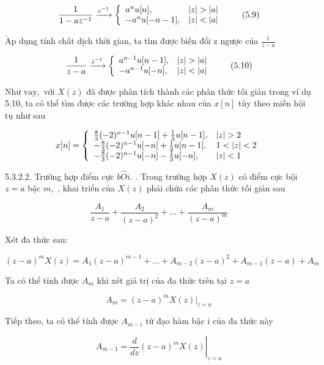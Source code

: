 \documentclass[
  10
]{article}
\begin{document}
\[
\frac {1}{1 - a z ^ {- 1}} \xrightarrow {z ^ {- 1}} \left\{ \begin{array}{l l} a ^ {n} u [ n ], & | z | > | a | \\ - a ^ {n} u [ - n - 1 ], & | z | <   | a | \end{array} \right.\tag{5.9}
\]

\(\mathrm { { \acute { A } p } }\) dụng tính chất dịch thời gian, ta tìm
được biến đổi z ngược của \(\scriptstyle { \frac { 1 } { z - a } }\)

\[
\frac {1}{z - a} \xrightarrow {z ^ {- 1}} \left\{ \begin{array}{l l} a ^ {n - 1} u [ n - 1 ], & | z | > | a | \\ - a ^ {n - 1} u [ - n ], & | z | <   | a | \end{array} \right.\tag{5.10}
\]

Như \(\mathrm { v a y , }\) với \(X ( z )\) đã được phân tích thành các
phân thức tối giản trong ví dụ 5.10, ta có thể tìm được các trường hợp
khác nhau của \(x [ n ]\) tùy theo miền hội tụ như sau

\[
x [ n ] = \left\{ \begin{array}{l l} \frac {8}{3} (- 2) ^ {n - 1} u [ n - 1 ] + \frac {1}{3} u [ n - 1 ], & | z | > 2 \\ - \frac {8}{3} (- 2) ^ {n - 1} u [ - n ] + \frac {1}{3} u [ n - 1 ], & 1 <   | z | <   2 \\ - \frac {8}{3} (- 2) ^ {n - 1} u [ - n ] - \frac {1}{3} u [ - n ], & | z | <   1 \end{array} \right.
\]

5.3.2.2. Trường hợp điểm cực \(b \hat { O } i .\) . Trong trường hợp
\(X ( z )\) có điểm cực bội \(z = a\) bậc \(m ,\) , khai triển của
\(X ( z )\) phải chứa các phân thức tối giản sau

\[
\frac {A _ {1}}{z - a} + \frac {A _ {2}}{(z - a) ^ {2}} + \dots + \frac {A _ {m}}{(z - a) ^ {m}}
\]

Xét đa thức sau:

\[
(z - a) ^ {m} X (z) = A _ {1} (z - a) ^ {m - 1} + \dots + A _ {m - 2} (z - a) ^ {2} + A _ {m - 1} (z - a) + A _ {m}
\]

Ta có thể tính được \(A _ { m }\) khi xét giá trị của đa thức trên tại
\(z = a\)

\[
A _ {m} = (z - a) ^ {m} X (z) | _ {z = a}
\]

Tiếp theo, ta có thể tính được \(A _ { m - i }\) từ đạo hàm bậc i của đa
thức này

\[
A _ {m - 1} = \left. \frac {d}{d z} (z - a) ^ {m} X (z) \right| _ {z = a}
\]
\end{document}
